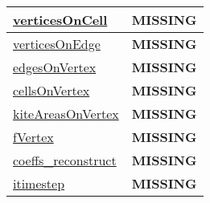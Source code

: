 {\begin{center}
\begin{longtable}{| p{2.0in} | p{4.0in} |}
    \hline
    \hyperref[subsec:var_sec_mesh_verticesOnCell]{verticesOnCell} & {\bf \color{red} MISSING} \\
    \hline
    \hyperref[subsec:var_sec_mesh_verticesOnEdge]{verticesOnEdge} & {\bf \color{red} MISSING} \\
    \hline
    \hyperref[subsec:var_sec_mesh_edgesOnVertex]{edgesOnVertex} & {\bf \color{red} MISSING} \\
    \hline
    \hyperref[subsec:var_sec_mesh_cellsOnVertex]{cellsOnVertex} & {\bf \color{red} MISSING} \\
    \hline
    \hyperref[subsec:var_sec_mesh_kiteAreasOnVertex]{kiteAreasOnVertex} & {\bf \color{red} MISSING} \\
    \hline
    \hyperref[subsec:var_sec_mesh_fVertex]{fVertex} & {\bf \color{red} MISSING} \\
    \hline
    \hyperref[subsec:var_sec_mesh_coeffs_reconstruct]{coeffs\_reconstruct} & {\bf \color{red} MISSING} \\
    \hline
    \hyperref[subsec:var_sec_mesh_itimestep]{itimestep} & {\bf \color{red} MISSING} \\
    \hline
\end{longtable}
\end{center}
}
